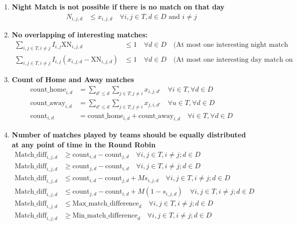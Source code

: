 \documentclass[a4paper, 12pt]{article}
\begin{document}
\begin{enumerate}
    \item \textbf{Night Match is not possible if there is no match on that day}
    \begin{align*}
        N_{i,j,d} &\leq x_{i,j,d} \quad \forall i,j \in T, d \in D \text{ and } i \neq j
    \end{align*}

    \item \textbf{No overlapping of interesting matches:}
    \begin{align*}
        \sum_{i,j \in T, i \neq j} I_{i,j} \text{XN}_{i,j,d} &\leq 1 \quad \forall d \in D \quad \text{(At most one interesting night match on a weekend)}\\
        \sum_{i,j \in T, i \neq j} I_{i,j} (x_{i,j,d} - \text{XN}_{i,j,d}) &\leq 1 \quad \forall d \in D \quad \text{(At most one interesting day match on a weekend)}
    \end{align*}

    \item \textbf{Count of Home and Away matches}
    \begin{align*}
        \text{count\_home}_{i,d} &= \sum_{d' \leq d} \sum_{j \in T; j \neq i} x_{i,j,d'} \quad \forall i \in T , \forall d \in D \\
        \text{count\_away}_{i,d} &= \sum_{d' \leq d} \sum_{j \in T; j \neq i} x_{j,i,d'} \quad \forall u \in T, \forall d \in D \\
        \text{count}_{i,d} &= \text{count\_home}_{i,d} + \text{count\_away}_{i,d} \quad \forall i \in T, \forall d \in D
    \end{align*}

    \item \textbf{Number of matches played by teams should be equally distributed at any point of time in the Round Robin}
    \begin{align*}
    \text{Match\_diff}_{i,j,d} &\geq \text{count}_{i,d} - \text{count}_{j,d} \quad \forall i,j \in T, i \neq j; d \in D\\
    \text{Match\_diff}_{i,j,d} &\geq \text{count}_{j,d} - \text{count}_{i,d}\quad \forall i,j \in T, i \neq j; d \in D\\
    \text{Match\_diff}_{i,j,d} &\leq \text{count}_{i,d} - \text{count}_{j,d} + M s_{i,j,d} \quad \forall i,j \in T, i \neq j; d \in D\\
    \text{Match\_diff}_{i,j,d} &\leq \text{count}_{j,d} - \text{count}_{i,d} + M (1 - s_{i,j,d}) \quad \forall i,j \in T, i \neq j; d \in D\\
    \text{Match\_diff}_{i,j,d} &\leq \text{Max\_match\_difference}_{d} \quad \forall i,j \in T, i \neq j; d \in D\\
    \text{Match\_diff}_{i,j,d} &\geq \text{Min\_match\_difference}_{d} \quad \forall i,j \in T, i \neq j; d \in D
    \end{align*}


\end{enumerate}
\end{document}
